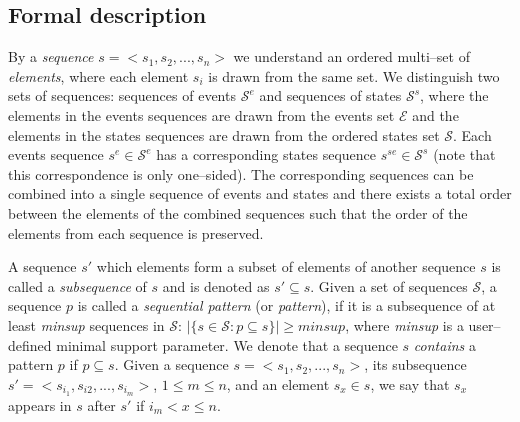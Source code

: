 \documentclass[runningheads,a4paper]{llncs}
\begin{document}
\subsection{Formal description}
By a \textit{sequence} $s=<s_1, s_2, ..., s_n>$ we understand an ordered multi--set of \textit{elements}, where each element $s_i$ is drawn from the same set.
We distinguish two sets of sequences: sequences of events $\mathcal{S}^e$ and sequences of states $\mathcal{S}^s$, where the elements in the events sequences are drawn from the events set $\mathcal{E}$ and the elements in the states sequences are drawn from the ordered states set $\mathcal{S}$.
Each events sequence $s^e\in\mathcal{S}^e$ has a corresponding states sequence $s^{se}\in\mathcal{S}^s$ (note that this correspondence is only one--sided).
The corresponding sequences can be combined into a single sequence of events and states and there exists a total order between the elements of the combined sequences such that the order of the elements from each sequence is preserved.

A sequence $s'$ which elements form a subset of elements of another sequence $s$ is called a \textit{subsequence} of $s$ and is denoted as $s'\subseteq s$.
Given a set of sequences $\mathcal{S}$, a sequence $p$ is called a \textit{sequential pattern} (or \textit{pattern}), if it is a subsequence of at least \textit{minsup} sequences in $\mathcal{S}$: $|\{s\in\mathcal{S}:p\subseteq s\}|\geq\textit{minsup}$, where \textit{minsup} is a user--defined minimal support parameter.
We denote that a sequence $s$ \textit{contains} a pattern $p$ if $p\subseteq s$.
Given a sequence $s=<s_1,s_2,...,s_n>$, its subsequence $s'=<s_{i_1}, s_{i2}, ..., s_{i_m}>$, $1\leq m\leq n$, and an element $s_x\in s$, we say that $s_x$ appears in $s$ after $s'$ if $i_m<x\leq n$.
\end{document}

